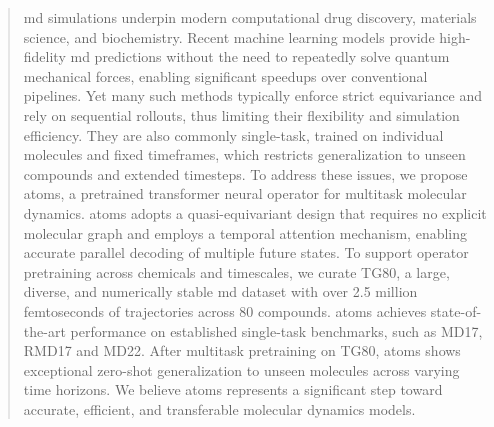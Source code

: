 \begin{abstract}

\Gls{md} simulations underpin modern computational drug discovery, materials science, and biochemistry. Recent machine learning models provide high-fidelity \gls{md} predictions without the need to repeatedly solve quantum mechanical forces, enabling significant speedups over conventional pipelines. Yet many such methods typically enforce strict equivariance and rely on sequential rollouts, thus limiting their flexibility and simulation efficiency. They are also commonly single-task, trained on individual molecules and fixed timeframes, which restricts generalization to unseen compounds and extended timesteps. To address these issues, we propose \gls{atoms}, a pretrained transformer neural operator for multitask molecular dynamics. \gls{atoms} adopts a quasi-equivariant design that requires no explicit molecular graph and employs a temporal attention mechanism, enabling accurate parallel decoding of multiple future states. To support operator pretraining across chemicals and timescales, we curate TG80, a large, diverse, and numerically stable \gls{md} dataset with over 2.5 million femtoseconds of trajectories across 80 compounds. \gls{atoms} achieves state-of-the-art performance on established single-task benchmarks, such as MD17, RMD17 and MD22. After multitask pretraining on TG80, \gls{atoms} shows exceptional zero-shot generalization to unseen molecules across varying time horizons. We believe \gls{atoms} represents a significant step toward accurate, efficient, and transferable molecular dynamics models.

\end{abstract}
